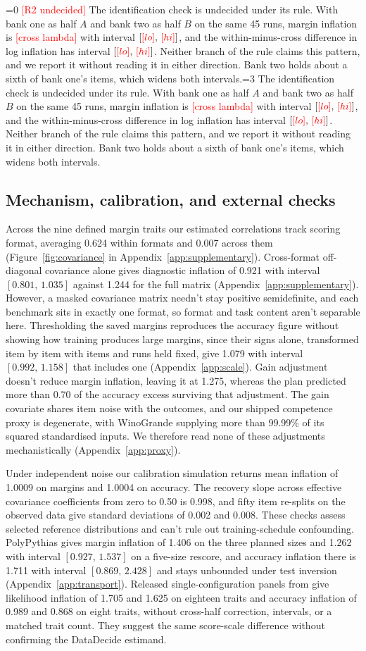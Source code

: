 \documentclass{article}
\newcommand{\ci}[2]{\ensuremath{[#1,\,#2]}}
\newcommand{\pending}[1]{\textcolor{red}{[#1]}}
\newcommand{\Rtwocase}{0}
\newcommand{\outcome}[4]{\ifnum#1=0 \pending{#3} #4\else\ifnum#1=#2 #4\fi\fi}
\begin{document}
\outcome{\Rtwocase}{3}{R2 undecided}{The identification check is undecided under its rule. With bank one as half $A$ and bank two as half $B$ on the same 45 runs, margin inflation is \pending{cross lambda} with interval \ci{\pending{lo}}{\pending{hi}}, and the within-minus-cross difference in log inflation has interval \ci{\pending{lo}}{\pending{hi}}. Neither branch of the rule claims this pattern, and we report it without reading it in either direction. Bank two holds about a sixth of bank one's items, which widens both intervals.}

\subsection{Mechanism, calibration, and external checks}
Across the nine defined margin traits our estimated correlations track scoring format, averaging 0.624 within formats and 0.007 across them (Figure~\ref{fig:covariance} in Appendix~\ref{app:supplementary}). Cross-format off-diagonal covariance alone gives diagnostic inflation of 0.921 with interval \ci{0.801}{1.035} against 1.244 for the full matrix (Appendix~\ref{app:supplementary}). However, a masked covariance matrix needn't stay positive semidefinite, and each benchmark sits in exactly one format, so format and task content aren't separable here. Thresholding the saved margins reproduces the accuracy figure without showing how training produces large margins, since their signs alone, transformed item by item with items and runs held fixed, give 1.079 with interval \ci{0.992}{1.158} that includes one (Appendix~\ref{app:scale}). Gain adjustment doesn't reduce margin inflation, leaving it at 1.275, whereas the plan predicted more than 0.70 of the accuracy excess surviving that adjustment. The gain covariate shares item noise with the outcomes, and our shipped competence proxy is degenerate, with WinoGrande supplying more than 99.99\% of its squared standardised inputs. We therefore read none of these adjustments mechanistically (Appendix~\ref{app:proxy}).

Under independent noise our calibration simulation returns mean inflation of 1.0009 on margins and 1.0004 on accuracy. The recovery slope across effective covariance coefficients from zero to 0.50 is 0.998, and fifty item re-splits on the observed data give standard deviations of 0.002 and 0.008. These checks assess selected reference distributions and can't rule out training-schedule confounding. PolyPythias gives margin inflation of 1.406 on the three planned sizes and 1.262 with interval \ci{0.927}{1.537} on a five-size rescore, and accuracy inflation there is 1.711 with interval \ci{0.869}{2.428} and stays unbounded under test inversion (Appendix~\ref{app:transport}). Released single-configuration panels from \citet{heineman2025} give likelihood inflation of 1.705 and 1.625 on eighteen traits and accuracy inflation of 0.989 and 0.868 on eight traits, without cross-half correction, intervals, or a matched trait count. They suggest the same score-scale difference without confirming the DataDecide estimand.
\end{document}

